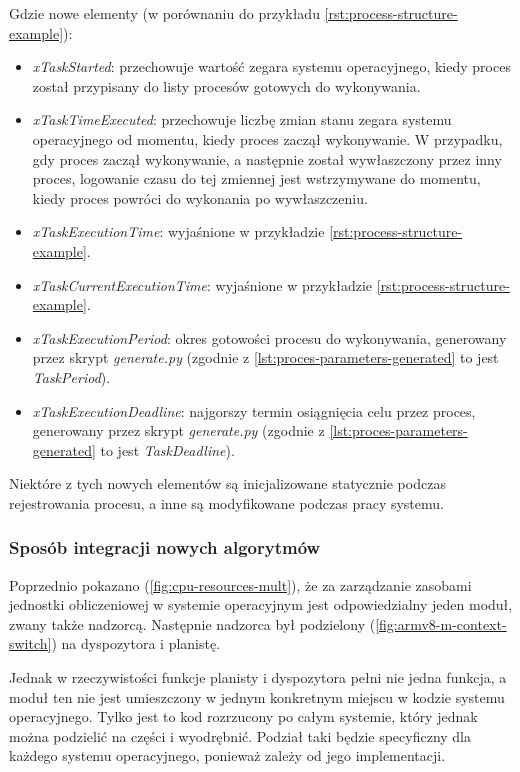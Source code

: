 \documentclass[../../main]{subfiles}
\begin{document}
Gdzie nowe elementy (w porównaniu do przykładu \ref{rst:process-structure-example}):

\begin{itemize}
    \item \textit{xTaskStarted}: przechowuje wartość zegara systemu operacyjnego, kiedy proces został przypisany do listy procesów gotowych do wykonywania.
    \item \textit{xTaskTimeExecuted}: przechowuje liczbę zmian stanu zegara systemu operacyjnego od momentu, kiedy proces zaczął wykonywanie. W przypadku, gdy proces zaczął wykonywanie, a następnie został wywłaszczony przez inny proces, logowanie czasu do tej zmiennej jest wstrzymywane do momentu, kiedy proces powróci do wykonania po wywłaszczeniu.
    \item \textit{xTaskExecutionTime}: wyjaśnione w przykładzie \ref{rst:process-structure-example}.
    \item \textit{xTaskCurrentExecutionTime}: wyjaśnione w przykładzie \ref{rst:process-structure-example}.
    \item \textit{xTaskExecutionPeriod}: okres gotowości procesu do wykonywania, generowany przez skrypt \textit{generate.py} (zgodnie z \ref{lst:proces-parameters-generated} to jest \textit{TaskPeriod}).
    \item \textit{xTaskExecutionDeadline}: najgorszy termin osiągnięcia celu przez proces, generowany przez skrypt \textit{generate.py} (zgodnie z \ref{lst:proces-parameters-generated} to jest \textit{TaskDeadline}).
\end{itemize}

Niektóre z tych nowych elementów są inicjalizowane statycznie podczas rejestrowania procesu, a inne są modyfikowane podczas pracy systemu.

\subsubsection{Sposób integracji nowych algorytmów}

Poprzednio pokazano (\cref{fig:cpu-resources-mult}), że za zarządzanie zasobami jednostki obliczeniowej w systemie operacyjnym jest odpowiedzialny jeden moduł, zwany także nadzorcą. Następnie nadzorca był podzielony (\cref{fig:armv8-m-context-switch}) na dyspozytora i planistę.

Jednak w rzeczywistości funkcje planisty i dyspozytora pełni nie jedna funkcja, a moduł ten nie jest umieszczony w jednym konkretnym miejscu w kodzie systemu operacyjnego. Tylko jest to kod rozrzucony po całym systemie, który jednak można podzielić na części i wyodrębnić. Podział taki będzie specyficzny dla każdego systemu operacyjnego, ponieważ zależy od jego implementacji.
\end{document}
